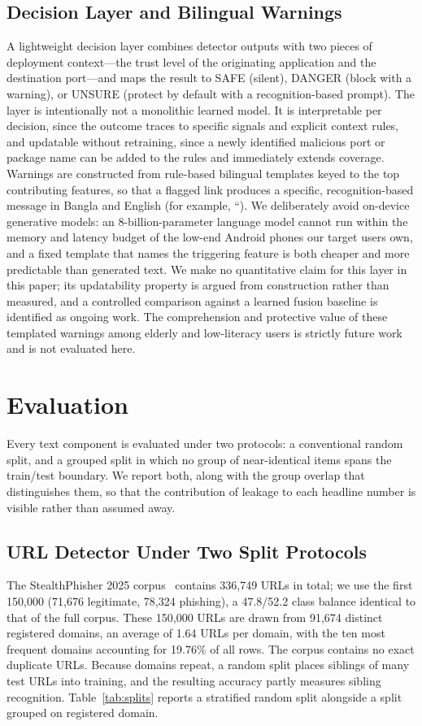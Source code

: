 \documentclass[manuscript,screen,review]{acmart}
\begin{document}
\subsection{Decision Layer and Bilingual Warnings}
A lightweight decision layer combines detector outputs with two pieces of deployment context---the trust level of the originating application and the destination port---and maps the result to SAFE (silent), DANGER (block with a warning), or UNSURE (protect by default with a recognition-based prompt). The layer is intentionally not a monolithic learned model. It is interpretable per decision, since the outcome traces to specific signals and explicit context rules, and updatable without retraining, since a newly identified malicious port or package name can be added to the rules and immediately extends coverage. Warnings are constructed from rule-based bilingual templates keyed to the top contributing features, so that a flagged link produces a specific, recognition-based message in Bangla and English (for example, ``). We deliberately avoid on-device generative models: an 8-billion-parameter language model cannot run within the memory and latency budget of the low-end Android phones our target users own, and a fixed template that names the triggering feature is both cheaper and more predictable than generated text. We make no quantitative claim for this layer in this paper; its updatability property is argued from construction rather than measured, and a controlled comparison against a learned fusion baseline is identified as ongoing work. The comprehension and protective value of these templated warnings among elderly and low-literacy users is strictly future work and is not evaluated here.

\section{Evaluation}
Every text component is evaluated under two protocols: a conventional random split, and a grouped split in which no group of near-identical items spans the train/test boundary. We report both, along with the group overlap that distinguishes them, so that the contribution of leakage to each headline number is visible rather than assumed away.

\subsection{URL Detector Under Two Split Protocols}
The StealthPhisher 2025 corpus~\cite{stealthphisher} contains 336{,}749 URLs in total; we use the first 150{,}000 (71{,}676 legitimate, 78{,}324 phishing), a 47.8/52.2 class balance identical to that of the full corpus. These 150{,}000 URLs are drawn from 91{,}674 distinct registered domains, an average of 1.64 URLs per domain, with the ten most frequent domains accounting for 19.76\% of all rows. The corpus contains no exact duplicate URLs. Because domains repeat, a random split places siblings of many test URLs into training, and the resulting accuracy partly measures sibling recognition. Table~\ref{tab:splits} reports a stratified random split alongside a split grouped on registered domain.
\end{document}
